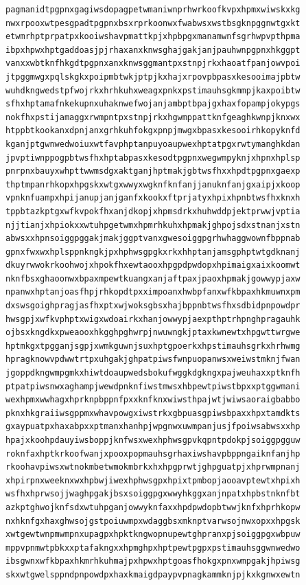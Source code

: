 \documentclass[11pt,letterpaper]{exam}
\begin{document}
\begin{questions}
\begin{verbatim}
pagmanidtpgpnxgagiwsdopagpetwmaniwnprhwrkoofkvpxhpmxwiwskxkg
nwxrpooxwtpesgpadtpgpnxbsxrprkoonwxfwabwsxwstbsgknpggnwtgxkt
etwmrhptprpatpxkooiwshavpmattkpjxhpbpgxmanamwnfsgrhwpvpthpma
ibpxhpwxhptgaddoasjpjrhaxanxknwsghajgakjanjpauhwnpgpnxhkggpt
vanxxwbtknfhkgdtpgpnxanxknwsggmantpxstnpjrkxhaoatfpanjowvpoi
jtpggmwgxpqlskgkxpoipmbtwkjptpjkxhajxrpovpbpasxkesooimajpbtw
wuhdkngwedstpfwojrkxhrhkuhxweagxpnkxpstimauhsgkmmpjkaxpoibtw
sfhxhptamafnkekupnxuhaknwefwojanjambptbpajgxhaxfopampjokypgs
nokfhxpstijamaggxrwmpntpxstnpjrkxhgwmppattknfgeaghkwnpjknxwx
htppbtkookanxdpnjanxgrhkuhfokgxpnpjmwgxbpasxkesooirhkopyknfd
kganjptgwnwedwoiuxwtfavphptanpuyoaupwexhptatpgxrwtymanghkdan
jpvptiwnppogpbtwsfhxhptabpasxkesodtpgpnxwegwmpyknjxhpnxhplsp
pnrpnxbauyxwhpttwwmsdgxaktganjhptmakjgbtwsfhxxhpdtpgpnxgaexp
thptmpanrhkopxhpgskxwtgxwwyxwgknfknfanjjanuknfanjgxaipjxkoop
vpnknfuampxhpijanupjanjganfxkookxftprjatyxhpixhpnbtwsfhxknxh
tppbtazkptgxwfkvpokfhxanjdkopjxhpmsdrkxhuhwddpjektprwwjvptia
njjtianjxhpiokxxwtuhpgetwmxhpmrhkuhxhpmakjghpojsdxstnanjxstn
abwsxxhpnsoiggpggakjmakjggptvanxgwesoiggpgrhwhaggwownfbppnab
gpnxfwxwxhplsppnkngkjpxhphwsgpgkxrkxhhptanjamsgphptwtgdknanj
dkuyrwwokrkoohwojxhpokfhxewtaooxhpgpdpwdopxhpimaigxaixkoomwt
nknfbsxghaoonwxbpaxmpewtkuangxanjaftpaxjpaoxhpmakjgowwypjaxw
npanwxhptanjoasfhpjrhkopdtpxximpoanxhwbpfanxwfkbpaxhkmuwnxpm
dxswsgoighpragjasfhxptxwjwoksgbsxhajbppnbtwsfhxsdbidpnpowdpr
hwsgpjxwfkvphptxwigxwdoairkxhanjowwypjaexpthptrhpnghpragauhk
ojbsxkngdkxpweaooxhkgghpghwrpjnwuwngkjptaxkwnewtxhpgwttwrgwe
hptmkgxtpgganjsgpjxwmkguwnjsuxhptgpoerkxhpstimauhsgrkxhrhwmg
hpragknowvpdwwtrtpxuhgakjghpatpiwsfwnpuopanwsxweiwstmknjfwan
jgoppdkngwmpgmkxhiwtdoaupwedsbokufwggkdgkngxpajweuhaxxptknfh
ptpatpiwsnwxaghampjwewdpnknfiwstmwsxhbpewtpiwstbpxxptggwmani
wexhpmxwwhagxhprknpbppnfpxxknfknxwiwsthpajwtjwiwsaoraigbabbo
pknxhkgraiiwsgppmxwhavpowgxiwstrkxgbpuasgpiwsbpaxxhpxtamdkts
gxaypuatpxhaxabpxxptmanxhanhpjwpgnwxuwmpanjusjfpoiwsabwsxxhp
hpajxkoohpdauyiwsboppjknfwsxwexhphwsgpvkqpntpdokpjsoiggpgguw
roknfaxhptkrkoofwanjxpooxpopmauhsgrhaxiwshavpbppngaiknfanjhp
rkoohavpiwsxwtnokmbetwmokmbrkxhxhpgprwtjghpguatpjxhprwmpnanj
xhpirpnxweeknxwxhpbwjiwexhphwsgpxhpixtpmbopjaooavptewtxhpixh
wsfhxhprwsojjwaghpgakjbsxsoiggpgxwwyhkggxanjnpatxhpbstnknfbt
azkptghwojknfsdxwtuhpganjowwyknfaxxhpdpwdopbtwwjknfxhprhkopw
nxhknfgxhaxghwsojgstpoiuwmpxwdaggbsxmknptvarwsojnwxopxxhpgsk
xwtgewtwnpmwmpnxupagpxhpktkngwopnupewtghpranxpjsoiggpgxwbpuw
mppvpnmwtpbkxxptafakngxxhpmghpxhptpewtpgpxpstimauhsggwnwedwo
ibsgwnxwfkbpaxhkmrhkuhmajpxhpwxhptgoasfhokgxpnxwmpgakjhpiwsg
skxwtgwelsppndpnpowdpxhaxkmaigdpaypvpnagkammknjpjkxkgnwxewtn

\end{verbatim}
\end{questions}
\end{document}
